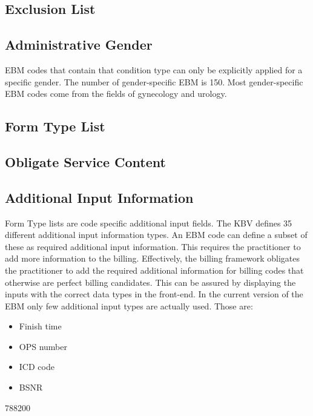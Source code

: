 \subsection{Exclusion List}\label{subsec:exclusion-list}

\subsection{Administrative Gender}\label{subsec:administrative-gender}
EBM codes that contain that condition type can only be explicitly applied for a specific gender.
The number of gender-specific EBM is 150.
Most gender-specific EBM codes come from the fields of gynecology and urology.

\subsection{Form Type List}\label{subsec:form-type-list}

\subsection{Obligate Service Content}\label{subsec:obligate-service-content}

\subsection{Additional Input Information}\label{subsec:additional-information}
Form Type lists are code specific additional input fields.
The KBV defines 35 different additional input information types.
An EBM code can define a subset of these as required additional input information.
This requires the practitioner to add more information to the billing.
Effectively, the billing framework obligates the practitioner to add the required additional information for billing codes that otherwise are perfect billing candidates.
This can be assured by displaying the inputs with the correct data types in the front-end.
In the current version of the EBM only few additional input types are actually used.
Those are:
\begin{itemize}
    \item Finish time
    \item OPS number
    \item ICD code
    \item BSNR
\end{itemize}


788200